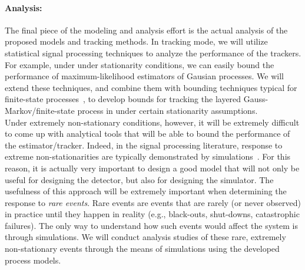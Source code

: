 \paragraph{Analysis:} The final piece of the modeling and analysis
effort is the actual analysis of the proposed models and tracking
methods. In tracking mode, we will utilize statistical signal
processing techniques to analyze the performance of the trackers.
For example, under under stationarity conditions, we can easily
bound the performance of maximum-likelihood estimators of Gausian
processes. We will extend these techniques, and combine them with
bounding techniques typical for finite-state processes~\cite{}, to
develop bounds for tracking the layered Gauss-Markov/finite-state
process in under certain stationarity assumptions.\\
\indent Under extremely non-stationary conditions, however, it will
be extremely difficult to come up with analytical tools that will be
able to bound the performance of the estimator/tracker. Indeed, in
the signal processing literature, response to extreme
non-stationarities are typically demonstrated by
simulations~\cite{signal_processing}. For this reason, it is
actually very important to design a good model that will not only be
useful for designing the detector, but also for designing the
simulator. The usefulness of this approach will be extremely
important when determining the response to {\em rare events}. Rare
events are events that are rarely (or never observed) in practice
until they happen in reality (e.g., black-outs, shut-downs,
catastrophic failures). The only way to understand how such events
would affect the system is through simulations. We will conduct
analysis studies of these rare, extremely non-stationary events
through the means of simulations using the developed process models.
